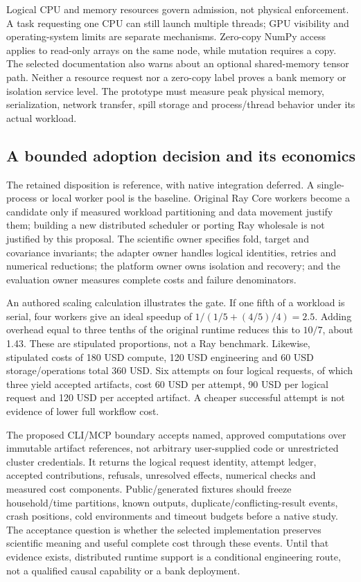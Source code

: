 Logical CPU and memory resources govern admission, not physical enforcement. A task requesting one CPU can still launch multiple threads; GPU visibility and operating-system limits are separate mechanisms. Zero-copy NumPy access applies to read-only arrays on the same node, while mutation requires a copy. The selected documentation also warns about an optional shared-memory tensor path. Neither a resource request nor a zero-copy label proves a bank memory or isolation service level. The prototype must measure peak physical memory, serialization, network transfer, spill storage and process/thread behavior under its actual workload.~\citep{exec24_ray_sources}

\subsection{A bounded adoption decision and its economics}
The retained disposition is reference, with native integration deferred. A single-process or local worker pool is the baseline. Original Ray Core workers become a candidate only if measured workload partitioning and data movement justify them; building a new distributed scheduler or porting Ray wholesale is not justified by this proposal. The scientific owner specifies fold, target and covariance invariants; the adapter owner handles logical identities, retries and numerical reductions; the platform owner owns isolation and recovery; and the evaluation owner measures complete costs and failure denominators.~\citep{exec24_ray_contract}

An authored scaling calculation illustrates the gate. If one fifth of a workload is serial, four workers give an ideal speedup of $1/(1/5+(4/5)/4)=2.5$. Adding overhead equal to three tenths of the original runtime reduces this to $10/7$, about 1.43. These are stipulated proportions, not a Ray benchmark. Likewise, stipulated costs of 180 USD compute, 120 USD engineering and 60 USD storage/operations total 360 USD. Six attempts on four logical requests, of which three yield accepted artifacts, cost 60 USD per attempt, 90 USD per logical request and 120 USD per accepted artifact. A cheaper successful attempt is not evidence of lower full workflow cost.~\citep{exec24_ray_contract}

The proposed CLI/MCP boundary accepts named, approved computations over immutable artifact references, not arbitrary user-supplied code or unrestricted cluster credentials. It returns the logical request identity, attempt ledger, accepted contributions, refusals, unresolved effects, numerical checks and measured cost components. Public/generated fixtures should freeze household/time partitions, known outputs, duplicate/conflicting-result events, crash positions, cold environments and timeout budgets before a native study. The acceptance question is whether the selected implementation preserves scientific meaning and useful complete cost through these events. Until that evidence exists, distributed runtime support is a conditional engineering route, not a qualified causal capability or a bank deployment.~\citep{exec24_ray_contract}


